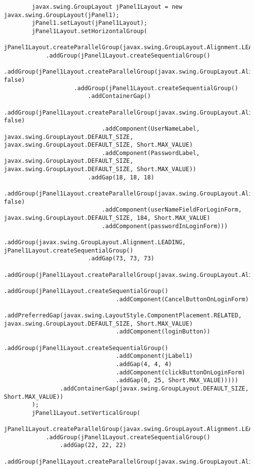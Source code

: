 \documentclass[12pt,a4paper]{article}
\begin{document}
\begin{lstlisting}
        javax.swing.GroupLayout jPanel1Layout = new javax.swing.GroupLayout(jPanel1);
        jPanel1.setLayout(jPanel1Layout);
        jPanel1Layout.setHorizontalGroup(
            jPanel1Layout.createParallelGroup(javax.swing.GroupLayout.Alignment.LEADING)
            .addGroup(jPanel1Layout.createSequentialGroup()
                .addGroup(jPanel1Layout.createParallelGroup(javax.swing.GroupLayout.Alignment.TRAILING, false)
                    .addGroup(jPanel1Layout.createSequentialGroup()
                        .addContainerGap()
                        .addGroup(jPanel1Layout.createParallelGroup(javax.swing.GroupLayout.Alignment.LEADING, false)
                            .addComponent(UserNameLabel, javax.swing.GroupLayout.DEFAULT_SIZE, javax.swing.GroupLayout.DEFAULT_SIZE, Short.MAX_VALUE)
                            .addComponent(PasswordLabel, javax.swing.GroupLayout.DEFAULT_SIZE, javax.swing.GroupLayout.DEFAULT_SIZE, Short.MAX_VALUE))
                        .addGap(18, 18, 18)
                        .addGroup(jPanel1Layout.createParallelGroup(javax.swing.GroupLayout.Alignment.LEADING, false)
                            .addComponent(userNameFieldForLoginForm, javax.swing.GroupLayout.DEFAULT_SIZE, 184, Short.MAX_VALUE)
                            .addComponent(passwordInLoginForm)))
                    .addGroup(javax.swing.GroupLayout.Alignment.LEADING, jPanel1Layout.createSequentialGroup()
                        .addGap(73, 73, 73)
                        .addGroup(jPanel1Layout.createParallelGroup(javax.swing.GroupLayout.Alignment.LEADING)
                            .addGroup(jPanel1Layout.createSequentialGroup()
                                .addComponent(CancelButtonOnLoginForm)
                                .addPreferredGap(javax.swing.LayoutStyle.ComponentPlacement.RELATED, javax.swing.GroupLayout.DEFAULT_SIZE, Short.MAX_VALUE)
                                .addComponent(loginButton))
                            .addGroup(jPanel1Layout.createSequentialGroup()
                                .addComponent(jLabel1)
                                .addGap(4, 4, 4)
                                .addComponent(clickButtonOnLoginForm)
                                .addGap(0, 25, Short.MAX_VALUE)))))
                .addContainerGap(javax.swing.GroupLayout.DEFAULT_SIZE, Short.MAX_VALUE))
        );
        jPanel1Layout.setVerticalGroup(
            jPanel1Layout.createParallelGroup(javax.swing.GroupLayout.Alignment.LEADING)
            .addGroup(jPanel1Layout.createSequentialGroup()
                .addGap(22, 22, 22)
                .addGroup(jPanel1Layout.createParallelGroup(javax.swing.GroupLayout.Alignment.BASELINE)

\end{lstlisting}
\end{document}
